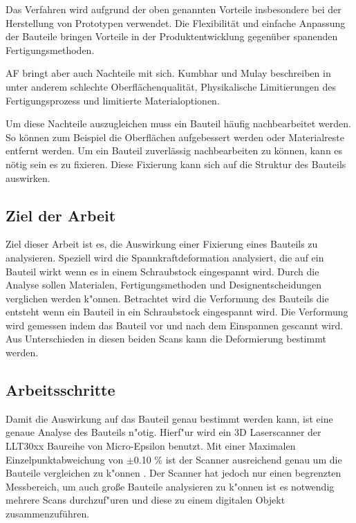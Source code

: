 \documentclass[../main.tex]{subfiles}
\begin{document}
    Das Verfahren wird aufgrund der oben genannten Vorteile insbesondere bei der Herstellung von
    Prototypen verwendet. Die Flexibilität und einfache Anpassung der Bauteile bringen Vorteile in der
    Produktentwicklung gegenüber spanenden Fertigungsmethoden. \cite{NYS2023}
    
    AF bringt aber auch Nachteile mit sich. Kumbhar und Mulay beschreiben in ~\cite{Kumbhar2018} unter 
    anderem schlechte Oberflächenqualität, Physikalische Limitierungen des Fertigungsprozess 
    und limitierte Materialoptionen.
    
    Um diese Nachteile auszugleichen muss ein Bauteil häufig nachbearbeitet werden. 
    So können zum Beispiel die Oberflächen aufgebessert werden oder Materialreste entfernt werden.
    Um ein Bauteil zuverlässig nachbearbeiten zu können, kann es nötig sein es zu fixieren.
    Diese Fixierung kann sich auf die Struktur des Bauteils auswirken.

    \subsection*{Ziel der Arbeit}
    Ziel dieser Arbeit ist es, die Auswirkung einer Fixierung eines Bauteils zu analysieren.
    Speziell wird die Spannkraftdeformation analysiert, die auf ein Bauteil wirkt wenn es in einem
    Schraubstock eingespannt wird.
    Durch die Analyse sollen Materialen, Fertigungsmethoden und Designentscheidungen verglichen werden
    k"onnen. Betrachtet wird die Verformung des Bauteils die entsteht wenn ein Bauteil
    in ein Schraubstock eingespannt wird. Die Verformung wird gemessen indem das Bauteil vor und nach
    dem Einspannen gescannt wird. Aus Unterschieden in diesen beiden Scans kann die Deformierung bestimmt 
    werden. 

    \subsection*{Arbeitsschritte}
    Damit die Auswirkung auf das Bauteil genau bestimmt werden kann, ist eine genaue Analyse des Bauteils
    n"otig. Hierf"ur wird ein 3D Laserscanner der LLT30xx Baureihe von Micro-Epsilon benutzt. Mit einer 
    Maximalen Einzelpunktabweichung von $\pm$0.10 \% ist der Scanner ausreichend genau um die Bauteile
    vergleichen zu k"onnen \cite{SCANNER}.
    Der Scanner hat jedoch nur einen begrenzten Messbereich, um auch große Bauteile analysieren 
    zu k"onnen ist es notwendig mehrere Scans durchzuf"uren und diese
    zu einem digitalen Objekt zusammenzuführen.

    
\end{document}
